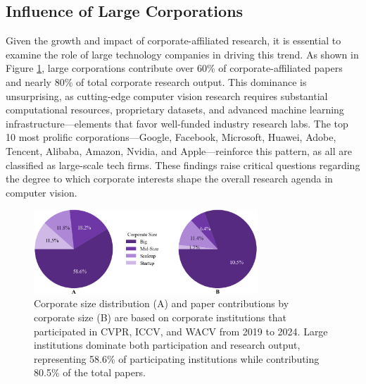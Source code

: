 \documentclass{article}
\begin{document}
\subsection{Influence of Large Corporations}
\vspace{-7pt}
Given the growth and impact of corporate-affiliated research, it is essential to examine the role of large technology companies in driving this trend. As shown in Figure \ref{fig:corporate_size_graph}, large corporations contribute over 60\% of corporate-affiliated papers and nearly 80\% of total corporate research output. This dominance is unsurprising, as cutting-edge computer vision research requires substantial computational resources, proprietary datasets, and advanced machine learning infrastructure—elements that favor well-funded industry research labs. The top 10 most prolific corporations—Google, Facebook, Microsoft, Huawei, Adobe, Tencent, Alibaba, Amazon, Nvidia, and Apple—reinforce this pattern, as all are classified as large-scale tech firms. These findings raise critical questions regarding the degree to which corporate interests shape the overall research agenda in computer vision.

\begin{figure}[ht]
  \centering
  \includegraphics[width=0.75\textwidth]{report/images/pie_charts.png}  
  \caption{Corporate size distribution (A) and paper contributions by corporate size (B) are based on corporate institutions that participated in CVPR, ICCV, and WACV from 2019 to 2024. Large institutions dominate both participation and research output, representing 58.6\% of participating institutions while contributing 80.5\% of the total papers.}
  \vspace{-10pt}
  \label{fig:corporate_size_graph}
\end{figure}

\vspace{-10pt}
\end{document}
